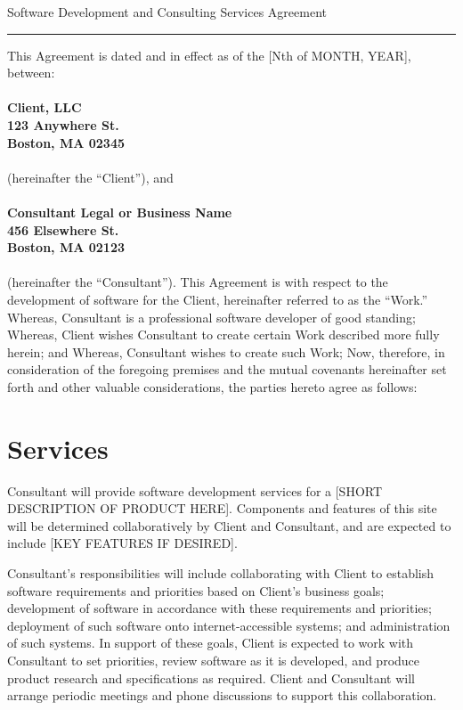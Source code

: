 \documentclass[10pt]{article}
\begin{document}
	
	\begin{center}
		{\Large Software Development and Consulting Services Agreement}
	\end{center}
	
	\hrule height .1mm
	
	
	\vspace{.5cm}
	
	\noindent This Agreement is dated and in effect as of the [Nth of MONTH, YEAR], between:\\
	\\
	{\bf Client, LLC\\
		123 Anywhere St.\\
		Boston, MA 02345\\}
	\\
	(hereinafter the ``Client''), and\\
	\\
	{\bf Consultant Legal or Business Name\\
		456 Elsewhere St.\\
		Boston, MA 02123\\}
	\\
	(hereinafter the ``Consultant'').  This Agreement is with respect to the
	development of software for the Client, hereinafter referred to as the
	``Work.''   Whereas, Consultant is a professional software developer of good
	standing; Whereas, Client wishes Consultant to create certain Work described
	more fully herein; and Whereas, Consultant wishes to create such Work; Now,
	therefore, in consideration of the foregoing premises and the mutual
	covenants hereinafter set forth and other valuable considerations, the
	parties hereto agree as follows: 
	
	
	\section{Services}
	
	Consultant will provide software development services for a [SHORT
	DESCRIPTION OF PRODUCT HERE].  Components and features of this site will
	be determined collaboratively by Client and Consultant, and are expected to
	include [KEY FEATURES IF DESIRED].
	
	Consultant's responsibilities will include collaborating with Client to
	establish software requirements and priorities based on Client's business
	goals; development of software in accordance with these requirements and
	priorities; deployment of such software onto internet-accessible systems;
	and administration of such systems.  In support of these goals, Client is
	expected to work with Consultant to set priorities, review software as it is
	developed, and produce product research and specifications as required.
	Client and Consultant will arrange periodic meetings and phone discussions
	to support this collaboration.
	
\end{document}
